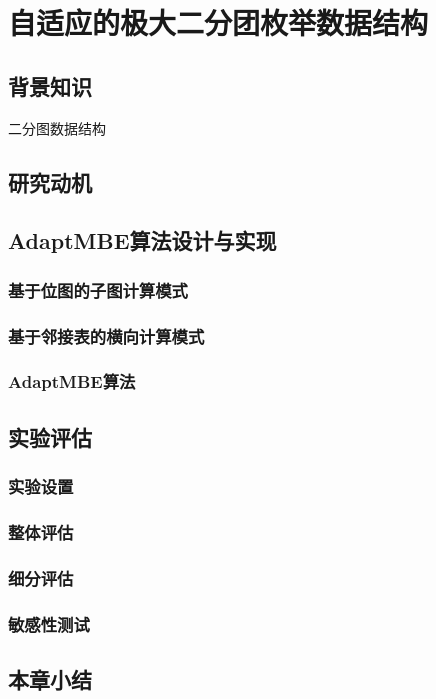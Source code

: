 \chapter{自适应的极大二分团枚举数据结构}
\label{ch:adapt_mbe}

\section{背景知识}
二分图数据结构

\section{研究动机}

\section{AdaptMBE算法设计与实现}

\subsection{基于位图的子图计算模式}

\subsection{基于邻接表的横向计算模式}

\subsection{AdaptMBE算法}

\section{实验评估}

\subsection{实验设置}

\subsection{整体评估}

\subsection{细分评估}

\subsection{敏感性测试}

\section{本章小结}